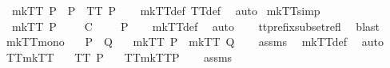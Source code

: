 \ \ {\isachardoublequoteopen}{\isacharparenleft}mkTT{}\ P\ {\isacharequal}\ P{\isacharparenright}\ {\isacharequal}\ TT{}\ P{\isachardoublequoteclose}\isanewline
%
\isadelimproof
\ \ %
\endisadelimproof
%
\isatagproof
{}\isamarkupfalse%
\ mkTT{}{\isacharunderscore}def\ TT{}{\isacharunderscore}def\ \isamarkupfalse%
\ auto%
\endisatagproof
{\isafoldproof}%
%
\isadelimproof
\isanewline
%
\endisadelimproof
\isanewline
{}\isamarkupfalse%
\ mkTT{}{\isacharunderscore}simp{\isacharcolon}\isanewline
\ \ {\isachardoublequoteopen}mkTT{}\ P\ {\isacharequal}\ {\isacharbraceleft}{\isasymrho}{\isacharbar}{\isasymrho}\ {\isasymsigma}{\isachardot}\ {\isasymrho}\ {\isasymlesssim}\isactrlsub C\ {\isasymsigma}\ {\isasymand}\ {\isasymsigma}\ {\isasymin}\ P{\isacharbraceright}{\isachardoublequoteclose}\isanewline
%
\isadelimproof
\ \ %
\endisadelimproof
%
\isatagproof
{}\isamarkupfalse%
\ mkTT{}{\isacharunderscore}def\ \isamarkupfalse%
\ auto\isanewline
\ \ \isamarkupfalse%
\ tt{\isacharunderscore}prefix{\isacharunderscore}subset{\isacharunderscore}refl\ \isamarkupfalse%
\ blast%
\endisatagproof
{\isafoldproof}%
%
\isadelimproof
\isanewline
%
\endisadelimproof
\isanewline
{}\isamarkupfalse%
\ mkTT{}{\isacharunderscore}mono{\isacharcolon}\isanewline
\ \ \ {\isachardoublequoteopen}P\ {\isasymsubseteq}\ Q{\isachardoublequoteclose}\isanewline
\ \ \ {\isachardoublequoteopen}mkTT{}\ P\ {\isasymsubseteq}\ mkTT{}\ Q{\isachardoublequoteclose}\isanewline
%
\isadelimproof
\ \ %
\endisadelimproof
%
\isatagproof
{}\isamarkupfalse%
\ assms\ \isamarkupfalse%
\ mkTT{}{\isacharunderscore}def\ \isamarkupfalse%
\ auto%
\endisatagproof
{\isafoldproof}%
%
\isadelimproof
\isanewline
%
\endisadelimproof
\isanewline
{}\isamarkupfalse%
\ TT{}{\isacharunderscore}mkTT{}{\isacharcolon}\isanewline
\ \ \ {\isachardoublequoteopen}TT{}\ P{\isachardoublequoteclose}\isanewline
\ \ \ {\isachardoublequoteopen}TT{}{\isacharparenleft}mkTT{}{\isacharparenleft}P{\isacharparenright}{\isacharparenright}{\isachardoublequoteclose}\isanewline
%
\isadelimproof
\ \ %
\endisadelimproof
%
\isatagproof
{}\isamarkupfalse%
\ assms\ \isamarkupfalse%
